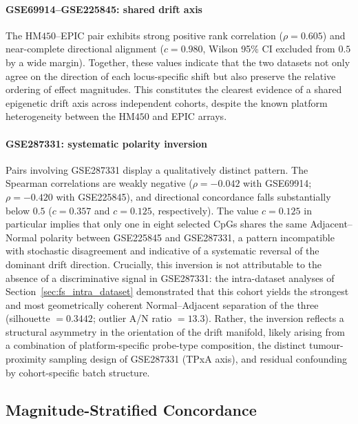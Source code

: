 \paragraph{GSE69914--GSE225845: shared drift axis}
The HM$450$--EPIC pair exhibits strong positive rank correlation
($\rho = 0.605$) and near-complete directional alignment
($c = 0.980$, Wilson 95\% CI excluded from $0.5$ by a wide margin).
Together, these values indicate that the two datasets not only
agree on the direction of each locus-specific shift but also
preserve the relative ordering of effect magnitudes.
This constitutes the clearest evidence of a shared epigenetic
drift axis across independent cohorts, despite the known
platform heterogeneity between the HM$450$ and EPIC arrays.

\paragraph{GSE287331: systematic polarity inversion}
Pairs involving GSE287331 display a qualitatively distinct pattern.
The Spearman correlations are weakly negative
($\rho = -0.042$ with GSE69914; $\rho = -0.420$ with GSE225845),
and directional concordance falls substantially below $0.5$
($c = 0.357$ and $c = 0.125$, respectively).
The value $c = 0.125$ in particular implies that only one in
eight selected CpGs shares the same Adjacent--Normal polarity
between GSE225845 and GSE287331, a pattern incompatible with
stochastic disagreement and indicative of a systematic reversal
of the dominant drift direction.
Crucially, this inversion is not attributable to the absence of a
discriminative signal in GSE287331: the intra-dataset analyses of
Section~\ref{sec:fs_intra_dataset} demonstrated that this cohort
yields the strongest and most geometrically coherent Normal--Adjacent
separation of the three (silhouette $= 0.3442$; outlier A/N ratio
$= 13.3$).
Rather, the inversion reflects a structural asymmetry in the
orientation of the drift manifold, likely arising from a combination
of platform-specific probe-type composition, the distinct
tumour-proximity sampling design of GSE287331 (TPxA axis), and
residual confounding by cohort-specific batch structure.

\subsection{Magnitude-Stratified Concordance}
\label{sec:inter_fs_magnitude}

